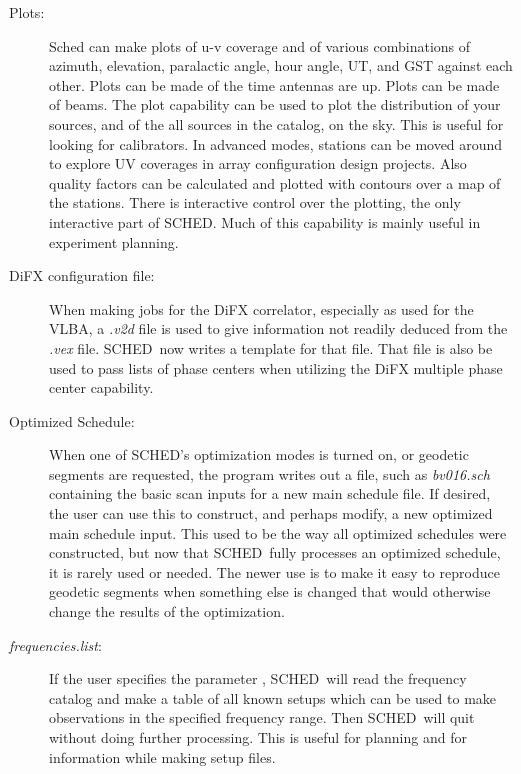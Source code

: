 \documentclass{report}
\newcommand{\sched}{{\sc SCHED}}
\newcommand{\schedb}{{\sc SCHED~}}
\begin{document}
\begin{description}
\item[Plots:] Sched can make plots of u-v coverage and of various
combinations of azimuth, elevation, paralactic angle, hour angle, UT,
and GST against each other.  Plots can be made of the time antennas
are up.  Plots can be made of beams.  The plot capability can be used
to plot the distribution of your sources, and of the all sources in
the catalog, on the sky.  This is useful for looking for calibrators.
In advanced modes, stations can be moved around to explore UV
coverages in array configuration design projects.  Also quality
factors can be calculated and plotted with contours over a map of the
stations.  There is interactive control over the plotting, the only
interactive part of SCHED.  Much of this capability is mainly useful
in experiment planning.

\item[DiFX configuration file:]  When making jobs for the DiFX
correlator, especially as used for the VLBA, a {\sl .v2d} file is
used to give information not readily deduced from the {\sl .vex}
file.  \schedb now writes a template for that file.  That file is
also be used to pass lists of phase centers when utilizing the DiFX
multiple phase center capability.

\item[Optimized Schedule:] When one of \sched's optimization modes is
turned on, or geodetic segments are requested, the program writes out
a file, such as {\sl bv016.sch} containing the basic scan inputs for a
new main schedule file.  If desired, the user can use this to
construct, and perhaps modify, a new optimized main schedule input.
This used to be the way all optimized schedules were constructed, but
now that \schedb fully processes an optimized schedule, it is rarely
used or needed.  The newer use is to make it easy to reproduce
geodetic segments when something else is changed that would otherwise
change the results of the optimization.

\item[{\sl frequencies.list}:]  If the user specifies the parameter
, \schedb will read the
frequency catalog and make a table of all known setups which can
be used to make observations in the specified frequency range.  Then
\schedb will quit without doing further processing.  This is useful
for planning and for information while making setup files.

\end{description}
\end{document}
